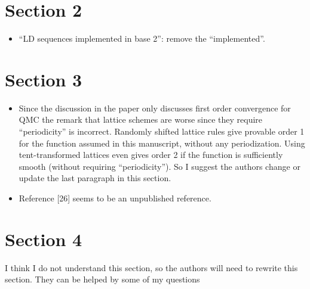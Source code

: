 \documentclass{article}[12pt]
\newcommand{\Referee}[1]{{\color{blue} #1}}
\begin{document}
\section{Section 2}

\begin{itemize}
    \item \Referee{``LD sequences implemented in base 2'': remove the ``implemented''.} 
\end{itemize}

\section{Section 3}

\begin{itemize}
    \item \Referee{Since the discussion in the paper only discusses first order convergence for QMC the remark that lattice schemes are worse since they require ``periodicity'' is incorrect. Randomly shifted lattice rules give provable order 1 for the function assumed in this manuscript, without any periodization. Using tent-transformed lattices even gives order 2 if the function is sufficiently smooth (without requiring ``periodicity''). So I suggest the authors change or update the last paragraph in this section.}
    \item \Referee{Reference [26] seems to be an unpublished reference.}
\end{itemize}

\section{Section 4}

\Referee{I think I do not understand this section, so the authors will need to rewrite
this section. They can be helped by some of my questions}
\end{document}
